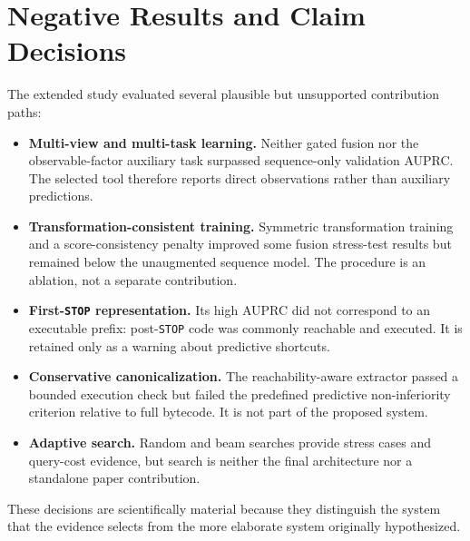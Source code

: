 \documentclass[conference]{IEEEtran}
\newcommand{\code}[1]{\texttt{#1}}
\begin{document}
\section{Negative Results and Claim Decisions}
\label{app:negative}

The extended study evaluated several plausible but unsupported contribution paths:
\begin{itemize}
  \item \textbf{Multi-view and multi-task learning.} Neither gated fusion nor the observable-factor
  auxiliary task surpassed sequence-only validation AUPRC. The selected tool therefore reports
  direct observations rather than auxiliary predictions.
  \item \textbf{Transformation-consistent training.} Symmetric transformation training and a
  score-consistency penalty improved some fusion stress-test results but remained below the
  unaugmented sequence model. The procedure is an ablation, not a separate contribution.
  \item \textbf{First-\code{STOP} representation.} Its high AUPRC did not correspond to an
  executable prefix: post-\code{STOP} code was commonly reachable and executed. It is retained
  only as a warning about predictive shortcuts.
  \item \textbf{Conservative canonicalization.} The reachability-aware extractor passed a bounded
  execution check but failed the predefined predictive non-inferiority criterion relative to full
  bytecode. It is not part of the proposed system.
  \item \textbf{Adaptive search.} Random and beam searches provide stress cases and query-cost
  evidence, but search is neither the final architecture nor a standalone paper contribution.
\end{itemize}

These decisions are scientifically material because they distinguish the system that the
evidence selects from the more elaborate system originally hypothesized.



\end{document}
